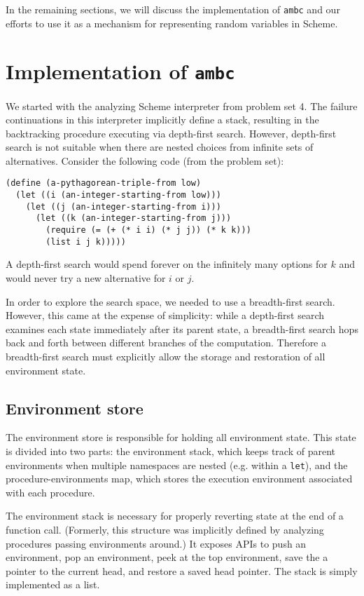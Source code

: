 \documentclass{article}
\begin{document}
In the remaining sections, we will discuss the implementation of
\texttt{ambc} and our efforts to use it as a mechanism for
representing random variables in Scheme.

\section{Implementation of \texttt{ambc}}

We started with the analyzing Scheme interpreter from problem set 4.  The
failure continuations in this interpreter implicitly define a stack, resulting
in the backtracking procedure executing via depth-first search.  However,
depth-first search is not suitable when there are nested choices from infinite
sets of alternatives. Consider the following code (from the problem set):
\begin{lstlisting}
(define (a-pythagorean-triple-from low)
  (let ((i (an-integer-starting-from low)))
    (let ((j (an-integer-starting-from i)))
      (let ((k (an-integer-starting-from j)))
        (require (= (+ (* i i) (* j j)) (* k k)))
        (list i j k)))))
\end{lstlisting}
A depth-first search would spend forever on the infinitely many options for $k$
and would never try a new alternative for $i$ or $j$.

In order to explore the search space, we needed to use a breadth-first
search.  However, this came at the expense of simplicity: while a
depth-first search examines each state immediately after its parent
state, a breadth-first search hops back and forth between different
branches of the computation.  Therefore a breadth-first search must
explicitly allow the storage and restoration of all environment state.

\subsection{Environment store}

The environment store is responsible for holding all environment
state.  This state is divided into two parts: the environment stack,
which keeps track of parent environments when multiple namespaces are
nested (e.g. within a \texttt{let}), and the procedure-environments
map, which stores the execution environment associated with each
procedure.

The environment stack is necessary for properly reverting state at the
end of a function call. (Formerly, this structure was implicitly
defined by analyzing procedures passing environments around.)  It
exposes APIs to push an environment, pop an environment, peek at the
top environment, save the a pointer to the current head, and restore
a saved head pointer.  The stack is simply implemented as a list.
\end{document}
